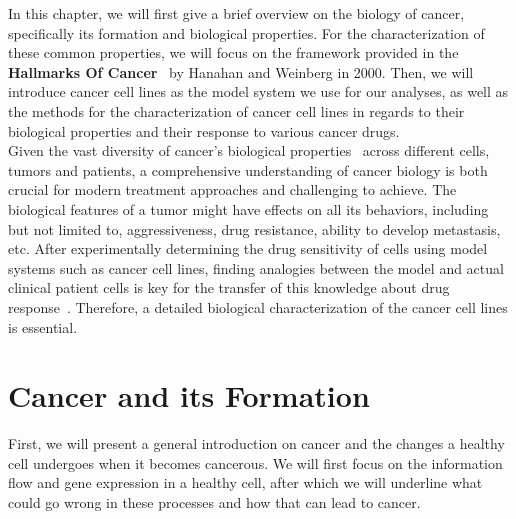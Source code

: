 In this chapter, we will first give a brief overview on the biology of cancer, specifically its formation and biological properties. For the characterization of these common properties, we will focus on the framework provided in the \textbf{Hallmarks Of Cancer}~\cite{hallmarks-of-cancer} by Hanahan and Weinberg in 2000. Then, we will introduce cancer cell lines as the model system we use for our analyses, as well as the methods for the characterization of cancer cell lines in regards to their biological properties and their response to various cancer drugs.\\
Given the vast diversity of cancer's biological properties~\cite{hallmarks-of-cancer,hallmarks_of_all_cancer_cells} across different cells, tumors and patients, a comprehensive understanding of cancer biology is both crucial for modern treatment approaches and challenging to achieve. The biological features of a tumor might have effects on all its behaviors, including but not limited to, aggressiveness, drug resistance, ability to develop metastasis, etc. After experimentally determining the drug sensitivity of cells using model systems such as cancer cell lines, finding analogies between the model and actual clinical patient cells is key for the transfer of this knowledge about drug response~\cite{cancer_cell_lines_useful_model}. Therefore, a detailed biological characterization of the cancer cell lines is essential.\\

\section{Cancer and its Formation}\label{sec:cancer_formation}
First, we will present a general introduction on cancer and the changes a healthy cell undergoes when it becomes cancerous. We will first focus on the information flow and gene expression in a healthy cell, after which we will underline what could go wrong in these processes and how that can lead to cancer.\\

